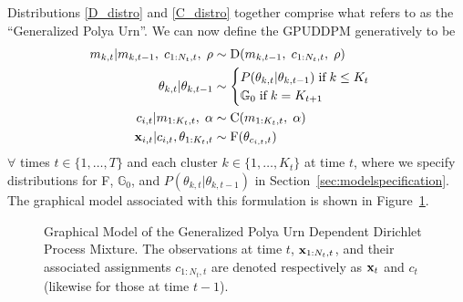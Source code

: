 \documentclass[twocolumn, final]{svjour3}
\begin{document}
Distributions \eqref{D_distro} and \eqref{C_distro} together comprise what \cite{caron_2007} refers to as the ``Generalized Polya Urn''. We can now define the GPUDDPM generatively to be
\begin{align}
\label{gpuddpm_def}
\begin{split}
m_{k,t} | m_{k,t-1}, \hspace{1mm} c_{1:N_{t}, t}, \hspace{1mm} \rho  &\sim \text{D}(m_{k,t-1}, \hspace{1mm} c_{1:N_{t}, t}, \hspace{1mm} \rho) \\
\theta_{k, t} | \theta_{k, t-1}   & \sim
\begin{cases}
  P(\theta_{k, t} | \theta_{k, t-1}) \hspace{1mm} \text{if} \hspace{1mm} k \leq K_{t} \\ %
  \mathbb{G}_{0} \hspace{1mm} \text{if} \hspace{1mm} k = K_{t+1}
\end{cases} \\
c_{i,t} | m_{1:K_{t},t}, \hspace{1mm} \alpha  &\sim  \text{C} (m_{1:K_{t},t}, \hspace{1mm} \alpha) \\
\bold{x}_{i,t} | c_{i,t}, \theta_{1:K_{t}, t} &\sim \text{F}(\theta_{c_{i,t}, t})
\end{split}
\end{align}
$\forall$ times $t \in \{1, \ldots, T\}$ and each cluster $k \in \{ 1, \ldots, K_{t} \}$ at time $t$, where we specify distributions for F, $\mathbb{G}_{0}$, and $P(\theta_{k, t} | \theta_{k, t-1})$ in Section~\ref{sec:modelspecification}. The graphical model associated with this formulation is shown in Figure~\ref{fig:gpuddpm_gm_1}.
\begin{figure}[h]
        \caption{\label{fig:gpuddpm_gm_1} Graphical Model of the Generalized Polya Urn Dependent Dirichlet Process Mixture. The observations at time $t$, $\bold{x}_{1:N_{t},t}$, and their associated assignments $c_{1:N_{t},t}$ are denoted respectively as $\bold{x}_{t}$ and $c_{t}$ (likewise for those at time $t-1$).}
\end{figure}
\end{document}
